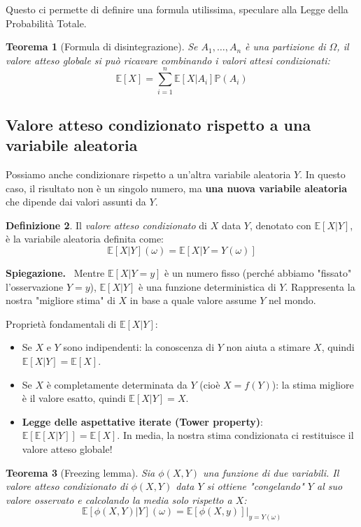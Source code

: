 \documentclass[11pt, a4paper]{report}
\theoremstyle{plain}
\newtheorem{theorem}{Teorema}[chapter]
\theoremstyle{definition}
\newtheorem{definition}[theorem]{Definizione}
\theoremstyle{remark}
\newenvironment{spiegazione}[1][Spiegazione]
{\begin{mdframed}[backgroundcolor=green!5, linecolor=green!50, linewidth=2pt, topline=false, rightline=false, bottomline=false]
\textbf{\textsf{#1.}}\ }
{\end{mdframed}}
\newcommand{\PP}{\mathbb{P}}
\newcommand{\E}{\mathbb{E}}
\newcommand{\1}{\mathbf{1}}
\begin{document}
Questo ci permette di definire una formula utilissima, speculare alla Legge della Probabilità Totale.

\begin{theorem}[Formula di disintegrazione]
Se $A_1, \dots, A_n$ è una partizione di $\Omega$, il valore atteso globale si può ricavare combinando i valori attesi condizionati:
\[ \E[X] = \sum_{i=1}^n \E[X|A_i] \PP(A_i) \]
\end{theorem}

\subsection{Valore atteso condizionato rispetto a una variabile aleatoria}

Possiamo anche condizionare rispetto a un'altra variabile aleatoria $Y$. In questo caso, il risultato non è un singolo numero, ma \textbf{una nuova variabile aleatoria} che dipende dai valori assunti da $Y$.

\begin{definition}
Il \emph{valore atteso condizionato} di $X$ data $Y$, denotato con $\E[X|Y]$, è la variabile aleatoria definita come:
\[ \E[X|Y](\omega) = \E[X | Y = Y(\omega)] \]
\end{definition}

\begin{spiegazione}
    Mentre $\E[X|Y=y]$ è un numero fisso (perché abbiamo "fissato" l'osservazione $Y=y$), $\E[X|Y]$ è una funzione deterministica di $Y$. Rappresenta la nostra "migliore stima" di $X$ in base a quale valore assume $Y$ nel mondo.
\end{spiegazione}

Proprietà fondamentali di $\E[X|Y]$:
\begin{itemize}
    \item Se $X$ e $Y$ sono indipendenti: la conoscenza di $Y$ non aiuta a stimare $X$, quindi $\E[X|Y] = \E[X]$.
    \item Se $X$ è completamente determinata da $Y$ (cioè $X = f(Y)$): la stima migliore è il valore esatto, quindi $\E[X|Y] = X$.
    \item \textbf{Legge delle aspettative iterate (Tower property)}: $\E[\E[X|Y]] = \E[X]$. In media, la nostra stima condizionata ci restituisce il valore atteso globale!
\end{itemize}

\begin{theorem}[Freezing lemma]
Sia $\phi(X,Y)$ una funzione di due variabili. Il valore atteso condizionato di $\phi(X,Y)$ data $Y$ si ottiene "congelando" $Y$ al suo valore osservato e calcolando la media solo rispetto a $X$:
\[ \E[\phi(X,Y)|Y](\omega) = \E[\phi(X, y)]\Big|_{y=Y(\omega)} \]
\end{theorem}
\end{document}
